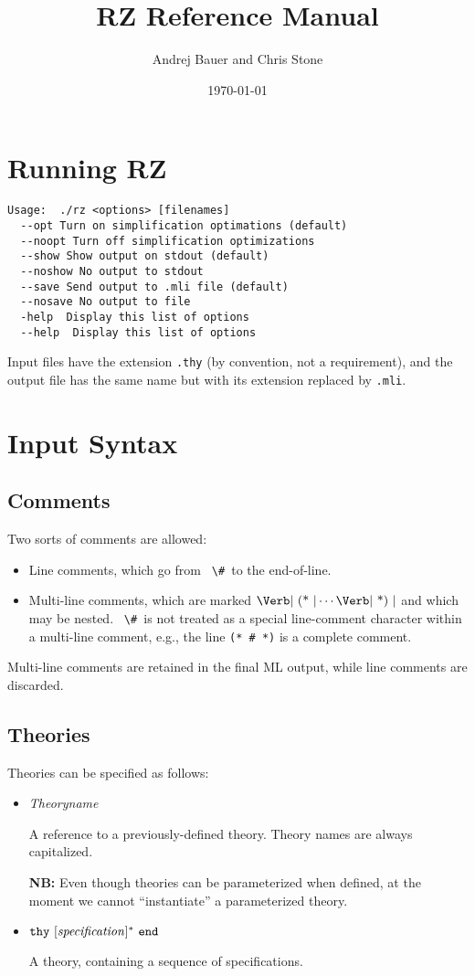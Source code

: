 \documentclass[11pt]{article}
\title{RZ Reference Manual}
\date{\today}
\author{Andrej Bauer and Chris Stone}
\newcommand{\keywd}[1]{\mbox{\texttt{#1}}\xspace}
\newcommand{\END}{\keywd{end}}
\newcommand{\THY}{\keywd{thy}}
\newcommand{\metav}[1]{\mbox{\textit{#1}}\xspace}
\newcommand{\TIdentifier}{\metav{Theoryname}}
\newcommand{\Specification}{\metav{specification}}
\newcommand{\HASH}{\mbox{\Verb| \# |}}
\newcommand{\LCOMMENT}{\mbox{\Verb| (* |}}
\newcommand{\RCOMMENT}{\mbox{\Verb| *) |}}
\newcommand{\NB}{\textbf{NB: }}
\begin{document}
\maketitle

\section{Running RZ}

\begin{Verbatim}
Usage:  ./rz <options> [filenames]
  --opt Turn on simplification optimations (default)
  --noopt Turn off simplification optimizations
  --show Show output on stdout (default)
  --noshow No output to stdout
  --save Send output to .mli file (default)
  --nosave No output to file
  -help  Display this list of options
  --help  Display this list of options
\end{Verbatim}

Input files have the extension \Verb|.thy| (by convention, not a requirement), and the 
output file has the same name but with its extension replaced by \Verb|.mli|.

\section{Input Syntax}

\subsection{Comments}

Two sorts of comments are allowed:
\begin{itemize}
\item Line comments, which go from \HASH to the end-of-line.
\item Multi-line comments, which are marked $\LCOMMENT \cdots
  \RCOMMENT$ and which may be nested.  \HASH is not treated as a
  special line-comment character within a multi-line comment, e.g.,
  the line \Verb|(* # *)| is a complete comment.
\end{itemize}

  Multi-line comments are retained in the final ML output, while line
  comments are discarded.

\subsection{Theories}

Theories can be specified as follows:
\begin{itemize}
\item \TIdentifier

   A reference to a previously-defined theory.  Theory names are always
   capitalized.
   
   \NB Even though theories can be parameterized when
     defined, at the moment we cannot ``instantiate'' a parameterized
     theory.

\item $\THY\ [\Specification]^*\ \END$

   A theory, containing a sequence of specifications.
\end{itemize}
\end{document}
